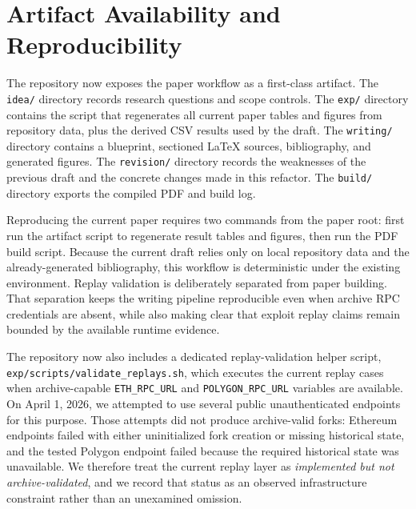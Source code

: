 \section{Artifact Availability and Reproducibility}
\label{sec:artifact}

The repository now exposes the paper workflow as a first-class artifact. The \texttt{idea/} directory records research questions and scope controls. The \texttt{exp/} directory contains the script that regenerates all current paper tables and figures from repository data, plus the derived CSV results used by the draft. The \texttt{writing/} directory contains a blueprint, sectioned \LaTeX{} sources, bibliography, and generated figures. The \texttt{revision/} directory records the weaknesses of the previous draft and the concrete changes made in this refactor. The \texttt{build/} directory exports the compiled PDF and build log.

Reproducing the current paper requires two commands from the paper root: first run the artifact script to regenerate result tables and figures, then run the PDF build script. Because the current draft relies only on local repository data and the already-generated bibliography, this workflow is deterministic under the existing environment. Replay validation is deliberately separated from paper building. That separation keeps the writing pipeline reproducible even when archive RPC credentials are absent, while also making clear that exploit replay claims remain bounded by the available runtime evidence.

The repository now also includes a dedicated replay-validation helper script, \texttt{exp/scripts/validate\_replays.sh}, which executes the current replay cases when archive-capable \texttt{ETH\_RPC\_URL} and \texttt{POLYGON\_RPC\_URL} variables are available. On April 1, 2026, we attempted to use several public unauthenticated endpoints for this purpose. Those attempts did not produce archive-valid forks: Ethereum endpoints failed with either uninitialized fork creation or missing historical state, and the tested Polygon endpoint failed because the required historical state was unavailable. We therefore treat the current replay layer as \emph{implemented but not archive-validated}, and we record that status as an observed infrastructure constraint rather than an unexamined omission.
